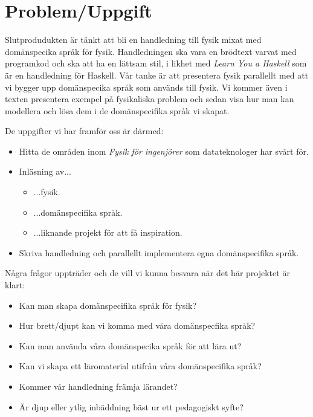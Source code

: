\documentclass[12pt,a4paper]{article}
\begin{document}
\section{Problem/Uppgift}

Slutprodudukten är tänkt att bli en handledning till fysik mixat med domänspecika språk för fysik. Handledningen ska vara en brödtext varvat med programkod och ska att ha en lättsam stil, i likhet med \textit{Learn You a Haskell}\cite{LYAH} som är en handledning för Haskell. Vår tanke är att presentera fysik parallellt med att vi bygger upp domänspecika språk som används till fysik. Vi kommer även i texten presentera exempel på fysikaliska problem och sedan visa hur man kan modellera och lösa dem i de domänspecifika språk vi skapat.

De uppgifter vi har framför oss är därmed:

\begin{itemize}
	\item Hitta de områden inom \textit{Fysik för ingenjörer} som datateknologer har svårt för.
	\item Inläsning av...
	\begin{itemize}
		\item ...fysik.
		\item ...domänspecifika språk.
		\item ...liknande projekt för att få inspiration.
	\end{itemize}
	\item Skriva handledning och parallellt implementera egna domänspecifika språk.
\end{itemize}


Några frågor uppträder och de vill vi kunna besvara när det här projektet är klart:
\begin{itemize}
    \item Kan man skapa domänspecifika språk för fysik?
    \item Hur brett/djupt kan vi komma med våra domänspecfika språk?
    \item Kan man använda våra domänspecika språk för att lära ut?
    \item Kan vi skapa ett läromaterial utifrån våra domänspecifika språk?
    \item Kommer vår handledning främja lärandet?
    \item Är djup eller ytlig inbäddning bäst ur ett pedagogiskt syfte?
\end{itemize}
\end{document}
